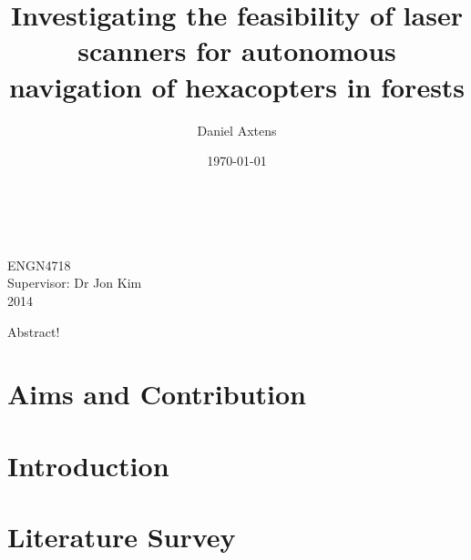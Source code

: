 \documentclass[12pt,oneside,a4paper]{book}
\title{Investigating the feasibility of laser scanners for autonomous
  navigation of hexacopters in forests}
\author{Daniel Axtens}
\date{\today}
\begin{document}
\pagestyle{empty}
\thispagestyle{empty}

\begin{titlepage}
  \enlargethispage{2cm}
  \begin{center}
    \makeatletter
    \Huge\textbf{\@title} \\[2.9cm]
    \huge\textbf{\@author} \\[10.5cm]
    \makeatother
    \LARGE ENGN4718\\
    Supervisor: Dr Jon Kim\\[2cm]
    2014
  \end{center}
\end{titlepage}


%

%

%

\cleardoublepage
\pagestyle{headings}
%
Abstract!
\cleardoublepage
\pagestyle{headings}
\tableofcontents

\mainmatter

\chapter{Aims and Contribution}
\label{cha:aims}

\chapter{Introduction}
\label{cha:intro}

\chapter{Literature Survey}
\label{cha:litsurvey}
\end{document}
